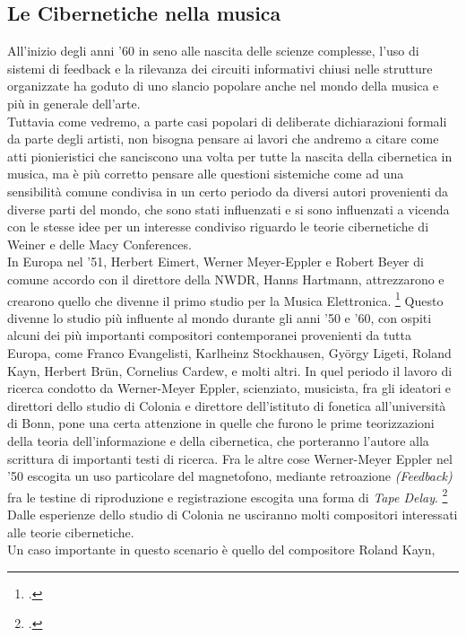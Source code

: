 \subsection{Le Cibernetiche nella musica}
\label{sec:Le cibernetiche nella musica}
All'inizio degli anni '60 in seno alle nascita delle scienze complesse,
l'uso di sistemi di feedback e la rilevanza dei circuiti informativi chiusi
nelle strutture organizzate
ha goduto di uno slancio popolare anche nel mondo della musica
e più in generale dell'arte. \\
Tuttavia come vedremo, a parte casi popolari di deliberate dichiarazioni
formali da parte degli artisti, non bisogna pensare ai lavori che andremo a citare
come atti pionieristici che sanciscono una volta per tutte la nascita della cibernetica in musica,
ma è più corretto pensare alle questioni sistemiche come ad una sensibilità
comune condivisa in un certo periodo da diversi autori provenienti da diverse parti del mondo,
che sono stati influenzati e si sono influenzati a vicenda
con le stesse idee per un interesse condiviso riguardo
le teorie cibernetiche di Weiner e delle Macy Conferences. \\
In Europa nel '51, Herbert Eimert, Werner Meyer-Eppler e Robert Beyer
di comune accordo con il direttore della NWDR, Hanns Hartmann,
attrezzarono e crearono quello che divenne il primo studio per la Musica Elettronica. 
\footcite{discipiocircuitideltempo}
Questo divenne lo studio più influente al mondo durante gli anni '50 e '60,
con ospiti alcuni dei più importanti compositori contemporanei provenienti da tutta Europa,
come Franco Evangelisti, Karlheinz Stockhausen, György Ligeti, Roland Kayn, Herbert Brün,
Cornelius Cardew, e molti altri.
In quel periodo il lavoro di ricerca condotto da Werner-Meyer Eppler,
scienziato, musicista, fra gli ideatori e direttori dello studio di Colonia e
direttore dell'istituto di fonetica all'università di Bonn,
pone una certa attenzione in quelle che furono le prime
teorizzazioni della teoria dell'informazione e della cibernetica,
che porteranno l'autore alla scrittura di importanti testi di ricerca.
Fra le altre cose Werner-Meyer Eppler nel '50 escogita un uso particolare
del magnetofono, mediante retroazione \textit{(Feedback)} fra le testine di riproduzione e 
registrazione escogita una forma di \textit{Tape Delay}. \footcite{discipiocircuitideltempo}
Dalle esperienze dello studio di Colonia ne usciranno molti compositori interessati
alle teorie cibernetiche. \\
Un caso importante in questo scenario è quello del compositore Roland Kayn,
